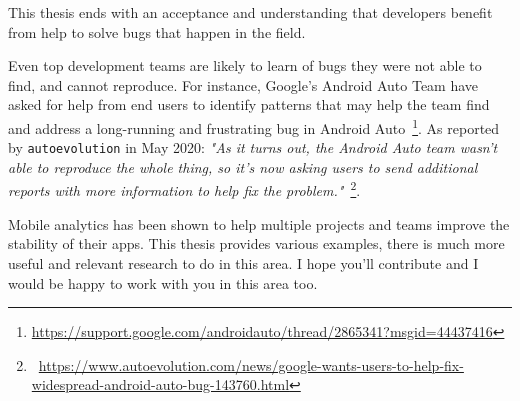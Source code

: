 This thesis ends with an acceptance and understanding that developers benefit from help to solve bugs that happen in the field.

Even top development teams are likely to learn of bugs they were not able to find, and cannot reproduce. For instance, Google's Android Auto Team have asked for help from end users to identify patterns that may help the team find and address a long-running and frustrating bug in Android Auto~\footnote{\url{https://support.google.com/androidauto/thread/2865341?msgid=44437416}}. As reported by \texttt{autoevolution} in May 2020:  
\emph{"As it turns out, the Android Auto team wasn’t able to reproduce the whole thing, so it’s now asking users to send additional reports with more information to help fix the problem."}~\footnote{~\url{https://www.autoevolution.com/news/google-wants-users-to-help-fix-widespread-android-auto-bug-143760.html}}.

Mobile analytics has been shown to help multiple projects and teams improve the stability of their apps. This thesis provides various examples, there is much more useful and relevant research to do in this area. I hope you'll contribute and I would be happy to work with you in this area too. 